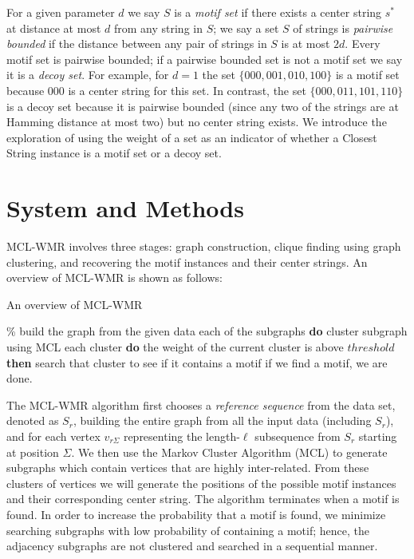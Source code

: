 For a given parameter $d$ we say $S$ is a {\em motif set} if there exists a center string $s^*$ at distance at most $d$ from any string in $S$; we say a set $S$ of strings is {\em pairwise bounded} if the distance between any pair of strings in $S$ is at most $2d$.  Every motif set is pairwise bounded; if a pairwise bounded set is not a motif set we say it is a {\em decoy set}.  For example, for $d=1$ the set $\{000, 001, 010, 100\}$ is a motif set because $000$ is a center string for this set.  In contrast, the set $\{000, 011, 101, 110 \}$ is a decoy set because it is pairwise bounded (since any two of the strings are at Hamming distance at most two) but no center string exists.  We introduce the exploration of using the weight of a set as an indicator of whether a {\sc Closest String} instance is a motif set or a decoy set. 

\section{System and Methods} \label{section:mcl_wmr_system}

MCL-WMR involves three stages: graph construction, clique finding using graph clustering, and recovering the motif instances and their center strings. An overview of MCL-WMR is shown as follows: 

\begin{algorithm*}
\caption{An overview of MCL-WMR}
\begin{algorithmic}
\STATE  \% build the graph from the given data
each of the subgraphs{ \bf do}
 \STATE \hspace{5mm}cluster subgraph using MCL
 	\STATE\hspace{5mm}{\bf for} each cluster {\bf do}
	\STATE\hspace{10mm}{\bf if} the weight of the current cluster is above $threshold$ {\bf then}
	\STATE\hspace{15mm}search that cluster to see if it contains a motif	
	\STATE\hspace{15mm}if we find a motif, we are done.
\end{algorithmic}
\end{algorithm*}

\noindent The MCL-WMR algorithm first chooses a {\em reference sequence} from the data set, denoted as $S_r$, building the entire graph from all the input data (including $S_r$), and for each vertex $v_{r \Sigma}$ representing the length-$\ell$ subsequence from $S_r$ starting at position $\Sigma$.  We then use the Markov Cluster Algorithm (MCL) \cite{vD00} to generate subgraphs which contain vertices that are highly inter-related. From these clusters of vertices we will generate the positions of the possible motif instances and their corresponding center string. The algorithm terminates when a motif is found.  In order to increase the probability that a motif is found, we minimize searching subgraphs with low probability of containing a motif; hence, the adjacency subgraphs are not clustered and searched in a sequential manner.
  

